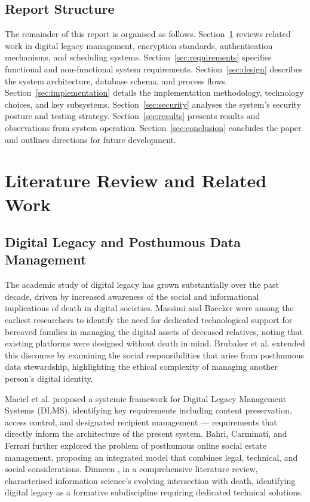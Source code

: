 \documentclass[12pt, a4paper]{article}
\begin{document}
\subsection{Report Structure}

The remainder of this report is organised as follows. Section~\ref{sec:literature} reviews related work in digital legacy management, encryption standards, authentication mechanisms, and scheduling systems. Section~\ref{sec:requirements} specifies functional and non-functional system requirements. Section~\ref{sec:design} describes the system architecture, database schema, and process flows. Section~\ref{sec:implementation} details the implementation methodology, technology choices, and key subsystems. Section~\ref{sec:security} analyses the system's security posture and testing strategy. Section~\ref{sec:results} presents results and observations from system operation. Section~\ref{sec:conclusion} concludes the paper and outlines directions for future development.

\section{Literature Review and Related Work}
\label{sec:literature}

\subsection{Digital Legacy and Posthumous Data Management}

The academic study of digital legacy has grown substantially over the past decade, driven by increased awareness of the social and informational implications of death in digital societies. Massimi and Baecker \cite{massimi2010} were among the earliest researchers to identify the need for dedicated technological support for bereaved families in managing the digital assets of deceased relatives, noting that existing platforms were designed without death in mind. Brubaker et al. \cite{brubaker2014} extended this discourse by examining the social responsibilities that arise from posthumous data stewardship, highlighting the ethical complexity of managing another person's digital identity.

Maciel et al. \cite{maciel2021, maciel2022} proposed a systemic framework for Digital Legacy Management Systems (DLMS), identifying key requirements including content preservation, access control, and designated recipient management — requirements that directly inform the architecture of the present system. Bahri, Carminati, and Ferrari \cite{bahri2015} further explored the problem of posthumous online social estate management, proposing an integrated model that combines legal, technical, and social considerations. Dinneen \cite{dinneen2024}, in a comprehensive literature review, characterised information science's evolving intersection with death, identifying digital legacy as a formative subdiscipline requiring dedicated technical solutions.
\end{document}
